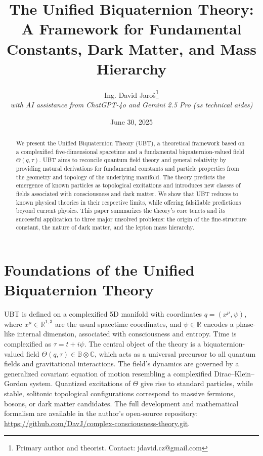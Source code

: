 \documentclass[12pt, a4paper]{article}
\title{\textbf{The Unified Biquaternion Theory: A Framework for Fundamental Constants, Dark Matter, and Mass Hierarchy}}
\author{Ing. David Jaroš\thanks{Primary author and theorist. Contact: jdavid.cz@gmail.com} \\
\textit{with AI assistance from ChatGPT-4o and Gemini 2.5 Pro (as technical aides)}}
\date{June 30, 2025}
\begin{document}
\maketitle

\begin{abstract}
We present the Unified Biquaternion Theory (UBT), a theoretical framework based on a complexified five-dimensional spacetime and a fundamental biquaternion-valued field \( \Theta(q, \tau) \). UBT aims to reconcile quantum field theory and general relativity by providing natural derivations for fundamental constants and particle properties from the geometry and topology of the underlying manifold. The theory predicts the emergence of known particles as topological excitations and introduces new classes of fields associated with consciousness and dark matter. We show that UBT reduces to known physical theories in their respective limits, while offering falsifiable predictions beyond current physics. This paper summarizes the theory's core tenets and its successful application to three major unsolved problems: the origin of the fine-structure constant, the nature of dark matter, and the lepton mass hierarchy.
\end{abstract}

\tableofcontents
\newpage

\section{Foundations of the Unified Biquaternion Theory}
UBT is defined on a complexified 5D manifold with coordinates \( q = (x^\mu, \psi) \), where \( x^\mu \in \mathbb{R}^{1,3} \) are the usual spacetime coordinates, and \( \psi \in \mathbb{R} \) encodes a phase-like internal dimension, associated with consciousness and entropy. Time is complexified as \( \tau = t + i\psi \). The central object of the theory is a biquaternion-valued field \( \Theta(q, \tau) \in \mathbb{B} \otimes \mathbb{C} \), which acts as a universal precursor to all quantum fields and gravitational interactions. The field's dynamics are governed by a generalized covariant equation of motion resembling a complexified Dirac–Klein–Gordon system. Quantized excitations of \( \Theta \) give rise to standard particles, while stable, solitonic topological configurations correspond to massive fermions, bosons, or dark matter candidates. The full development and mathematical formalism are available in the author's open-source repository: \url{https://github.com/DavJ/complex-consciousness-theory.git}.
\end{document}
